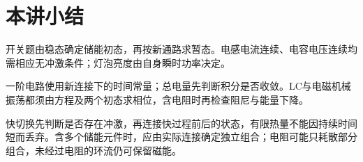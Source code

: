 \section{本讲小结}
开关题由稳态确定储能初态，再按新通路求暂态。电感电流连续、电容电压连续均需相应无冲激条件；灯泡亮度由自身瞬时功率决定。

一阶电路使用新连接下的时间常量；总电量先判断积分是否收敛。LC与电磁机械振荡都须由方程及两个初态求相位，含电阻时再检查阻尼与能量下降。


快切换先判断是否存在冲激，再连接快过程前后的状态，有限热量不能因持续时间短而丢弃。含多个储能元件时，应由实际连接确定独立组合；电阻可能只耗散部分组合，未经过电阻的环流仍可保留磁能。
